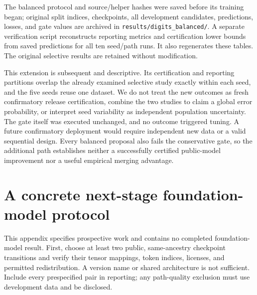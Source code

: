 \documentclass[11pt,letterpaper]{article}
\begin{document}
\begin{table}[ht]
\centering\footnotesize
\setlength{\tabcolsep}{3pt}

\caption{All ten seed/path outcomes. S and B denote selective and balanced continuation; the four accuracy columns use the reporting split. The chosen proposal is fixed using development observations; S/L in its column denotes scalar/layer interpolation. Coefficients are displayed to three decimals and saved at full precision. ``Min.\ $\Delta$'' is the chosen proposal's worst reporting class difference. Gate outcomes use the separate within-run certification split; no failed result was omitted.}
\label{tab:digits_path_seeds}
\end{table}

The balanced protocol and source/helper hashes were saved before its training began; original split indices, checkpoints, all development candidates, predictions, losses, and gate values are archived in \texttt{results/digits\_balanced/}. A separate verification script reconstructs reporting metrics and certification lower bounds from saved predictions for all ten seed/path runs. It also regenerates these tables. The original selective results are retained without modification.

This extension is subsequent and descriptive. Its certification and reporting partitions overlap the already examined selective study exactly within each seed, and the five seeds reuse one dataset. We do not treat the new outcomes as fresh confirmatory release certification, combine the two studies to claim a global error probability, or interpret seed variability as independent population uncertainty. The gate itself was executed unchanged, and no outcome triggered tuning. A future confirmatory deployment would require independent new data or a valid sequential design. Every balanced proposal also fails the conservative gate, so the additional path establishes neither a successfully certified public-model improvement nor a useful empirical merging advantage.

\section{A concrete next-stage foundation-model protocol}
This appendix specifies prospective work and contains no completed foundation-model result. First, choose at least two public, same-ancestry checkpoint transitions and verify their tensor mappings, token indices, licenses, and permitted redistribution. A version name or shared architecture is not sufficient. Include every prespecified pair in reporting; any path-quality exclusion must use development data and be disclosed.
\end{document}
